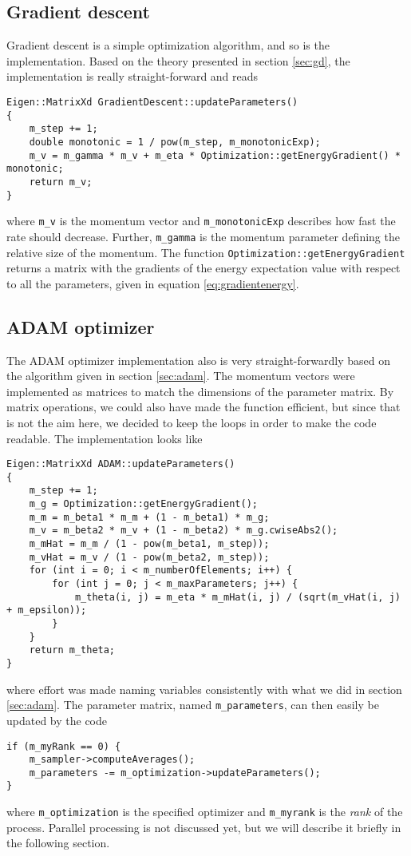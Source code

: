 \subsection{Gradient descent}
Gradient descent is a simple optimization algorithm, and so is the implementation. Based on the theory presented in section \ref{sec:gd}, the implementation is really straight-forward and reads
\begin{lstlisting}
Eigen::MatrixXd GradientDescent::updateParameters()
{
	m_step += 1;
	double monotonic = 1 / pow(m_step, m_monotonicExp);
	m_v = m_gamma * m_v + m_eta * Optimization::getEnergyGradient() * monotonic;
	return m_v;
}
\end{lstlisting}
where \lstinline|m_v| is the momentum vector and \lstinline|m_monotonicExp| describes how fast the rate should decrease. Further, \lstinline|m_gamma| is the momentum parameter defining the relative size of the momentum. The function \lstinline|Optimization::getEnergyGradient| returns a matrix with the gradients of the energy expectation value with respect to all the parameters, given in equation \eqref{eq:gradientenergy}.

\subsection{ADAM optimizer}
The ADAM optimizer implementation also is very straight-forwardly based on the algorithm given in section \ref{sec:adam}. The momentum vectors were implemented as matrices to match the dimensions of the parameter matrix. By matrix operations, we could also have made the function efficient, but since that is not the aim here, we decided to keep the loops in order to make the code readable. The implementation looks like
\begin{lstlisting}
Eigen::MatrixXd ADAM::updateParameters()
{
	m_step += 1;
	m_g = Optimization::getEnergyGradient();
	m_m = m_beta1 * m_m + (1 - m_beta1) * m_g;
	m_v = m_beta2 * m_v + (1 - m_beta2) * m_g.cwiseAbs2();
	m_mHat = m_m / (1 - pow(m_beta1, m_step));
	m_vHat = m_v / (1 - pow(m_beta2, m_step));
	for (int i = 0; i < m_numberOfElements; i++) {
		for (int j = 0; j < m_maxParameters; j++) {
			m_theta(i, j) = m_eta * m_mHat(i, j) / (sqrt(m_vHat(i, j) + m_epsilon));
		}
	}
	return m_theta;
}
\end{lstlisting}
where effort was made naming variables consistently with what we did in section \ref{sec:adam}. The parameter matrix, named \lstinline|m_parameters|, can then easily be updated by the code
\begin{lstlisting}
if (m_myRank == 0) {
	m_sampler->computeAverages();
	m_parameters -= m_optimization->updateParameters();
}
\end{lstlisting}
where \lstinline|m_optimization| is the specified optimizer and \lstinline|m_myrank| is the \textit{rank} of the process. Parallel processing is not discussed yet, but we will describe it briefly in the following section.

